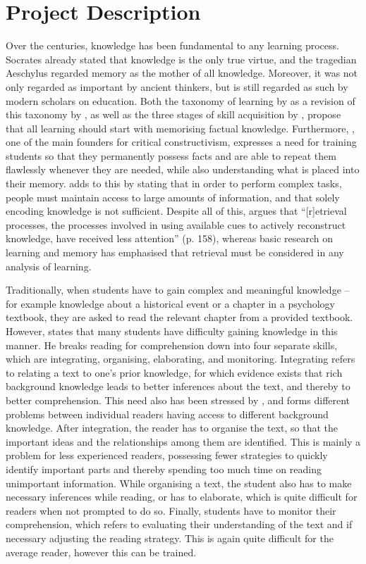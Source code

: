 \chapter{Project Description}

\label{ch:problem}

Over the centuries, knowledge has been fundamental to any learning process. Socrates already stated that knowledge is the only true virtue, and the tragedian Aeschylus regarded memory as the mother of all knowledge. Moreover, it was not only regarded as important by ancient thinkers, but is still regarded as such by modern scholars on education. Both the taxonomy of learning by  as a revision of this taxonomy by , as well as the three stages of skill acquisition by , propose that all learning should start with memorising factual knowledge. Furthermore, , one of the main founders for critical constructivism, expresses a need for training students so that they permanently possess facts and are able to repeat them flawlessly whenever they are needed, while also understanding what is placed into their memory.  adds to this by stating that in order to perform complex tasks, people must maintain access to large amounts of information, and that solely encoding knowledge is not sufficient. Despite all of this,  argues that ``[r]etrieval processes, the processes involved in using available cues to actively reconstruct knowledge, have received less attention'' (p. 158), whereas basic research on learning and memory has emphasised that retrieval must be considered in any analysis of learning.

Traditionally, when students have to gain complex and meaningful knowledge -- for example knowledge about a historical event or a chapter in a psychology textbook, they are asked to read the relevant chapter from a provided textbook. However,  states that many students have difficulty gaining knowledge in this manner. He breaks reading for comprehension down into four separate skills, which are integrating, organising, elaborating, and monitoring. Integrating refers to relating a text to one's prior knowledge, for which evidence exists that rich background knowledge leads to better inferences about the text, and thereby to better comprehension. This need also has been stressed by , and forms different problems between individual readers having access to different background knowledge. After integration, the reader has to organise the text, so that the important ideas and the relationships among them are identified. This is mainly a problem for less experienced readers, possessing fewer strategies to quickly identify important parts and thereby spending too much time on reading unimportant information. While organising a text, the student also has to make necessary inferences while reading, or has to elaborate, which is quite difficult for readers when not prompted to do so. Finally, students have to monitor their comprehension, which refers to evaluating their understanding of the text and if necessary adjusting the reading strategy. This is again quite difficult for the average reader, however this can be trained.

